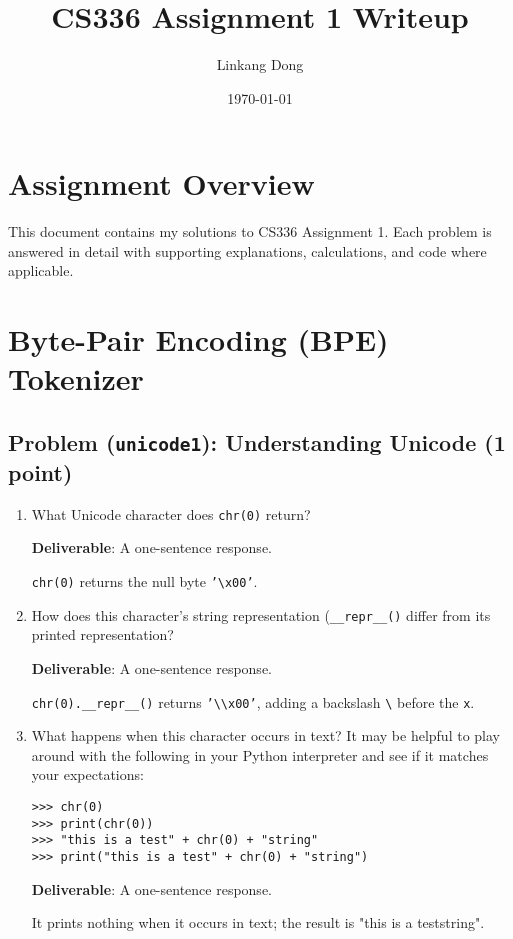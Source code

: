 \documentclass{article}
\title{CS336 Assignment 1 Writeup}
\author{Linkang Dong}
\date{\today}
\newcounter{problem}
\newcommand{\problem}[2]{
    \stepcounter{problem}
    \subsection{Problem (\texttt{#1}): #2}
    \vspace{-2em} %
    \noindent
}
\begin{document}
\maketitle

\tableofcontents

\section{Assignment Overview}
\vspace{-1em}

This document contains my solutions to CS336 Assignment 1. Each problem is answered in detail with supporting explanations, calculations, and code where applicable.

\section{Byte-Pair Encoding (BPE) Tokenizer}
\vspace{-1em}

\problem{unicode1}{Understanding Unicode (1 point)}

\begin{enumerate}[label=(\alph*)]
    \item {What Unicode character does \texttt{chr(0)} return?}
    
    {\textbf{Deliverable}: A one-sentence response.}
    
    \begin{answer}
    \texttt{chr(0)} returns the null byte \texttt{'\textbackslash x00'}.
    \end{answer}
    
    \item {How does this character's string representation (\texttt{\_\_repr\_\_()} differ from its printed representation?}
    
    {\textbf{Deliverable}: A one-sentence response.}
    
    \begin{answer}
    \texttt{chr(0).\_\_repr\_\_()} returns \texttt{'\textbackslash\textbackslash x00'}, adding a backslash \texttt{\textbackslash} before the \texttt{x}.
    \end{answer}
    
    \item {What happens when this character occurs in text? It may be helpful to play around with the following in your Python interpreter and see if it matches your expectations:}
    
    \begin{lstlisting}
>>> chr(0)
>>> print(chr(0))
>>> "this is a test" + chr(0) + "string"
>>> print("this is a test" + chr(0) + "string")
    \end{lstlisting}
    
    {\textbf{Deliverable}: A one-sentence response.}
    
    \begin{answer}
    It prints nothing when it occurs in text; the result is "this is a teststring".
    \end{answer}
\end{enumerate}
\end{document}
